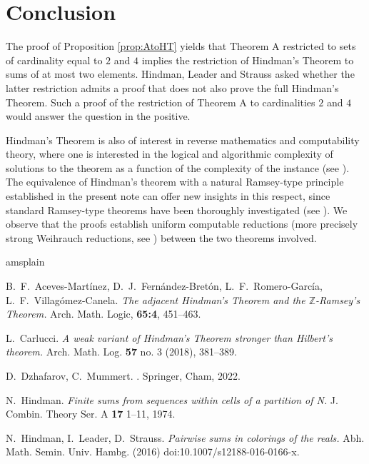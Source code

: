 \documentclass[11pt]{amsart}
\theoremstyle{definition}
\begin{document}
\section{Conclusion}

The proof of Proposition \ref{prop:AtoHT} yields that Theorem A restricted to sets of cardinality equal to $2$ and $4$ implies 
the restriction of Hindman's Theorem to sums of at most two elements. Hindman, Leader and Strauss \cite{HLS:16} asked whether
the latter restriction admits a proof that does not also prove the full Hindman's Theorem. Such a proof of the 
restriction of Theorem A to cardinalities $2$ and $4$ would answer the question in the positive. 

Hindman's Theorem is also of interest in reverse mathematics and computability theory, 
where one is interested in the logical and algorithmic complexity of solutions to the theorem as a function of the complexity of the instance 
(see \cite[Section 9.9]{Dza-Mum:22}). The equivalence of Hindman's theorem with a natural Ramsey-type principle established in the present note can offer new insights in this respect, since standard Ramsey-type theorems have been thoroughly investigated (see \cite[Chapter 8]{Dza-Mum:22}). We observe that the proofs establish uniform computable reductions (more precisely strong Weihrauch reductions, see \cite{Dza-Mum:22}) between the two theorems involved.

\begin{thebibliography}{amsplain}

B.~F.~Aceves-Martínez, D.~J.~Fernández-Bretón, L.~F.~Romero-García, L.~F.~Villagómez-Canela.
{\em The adjacent Hindman’s Theorem and the $\mathbb{Z}$-Ramsey’s Theorem.}
Arch. Math. Logic, {\bf 65:4}, 451--463.


L.~Carlucci.
{\em A weak variant of Hindman's Theorem stronger than Hilbert's theorem.} 
Arch. Math. Log. {\bf 57} no. 3 (2018), 381--389.


\newblock D.~Dzhafarov, C.~Mummert.
. 
\newblock Springer, Cham, 2022. 



N.~Hindman. 
{\em Finite sums from sequences within cells of a partition of N.}
J. Combin. Theory Ser. A
{\bf 17} 1--11, 1974.

N.~Hindman, I.~Leader, D.~Strauss.
{\em Pairwise sums in colorings of the reals.}
Abh. Math. Semin. Univ. Hambg. (2016)
doi:10.1007/s12188-016-0166-x. 

\end{thebibliography}
\end{document}
